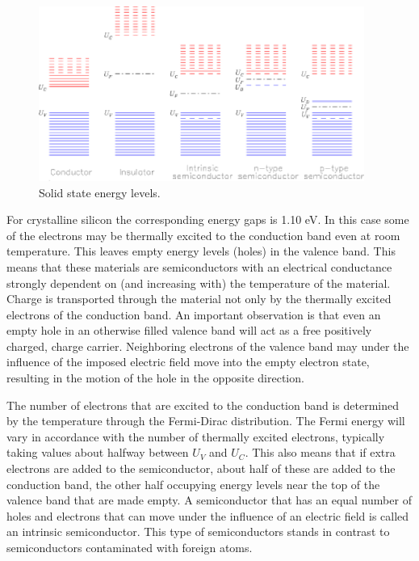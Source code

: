 \documentclass{article}
\begin{document}
\begin{figure}[h]
	\centering
	\includegraphics[width=0.95\textwidth]{CCD_solstate.eps}
	\caption{Solid state energy levels.}
	\label{fig:CCD.figsolstate}
\end{figure}

For crystalline silicon the corresponding energy gaps is 1.10 eV. In
this case some of the electrons may be thermally excited to the
conduction band even at room temperature. This leaves empty energy
levels (holes) in the valence band. This means that these materials
are semiconductors with an electrical conductance strongly dependent
on (and increasing with) the temperature of the material. Charge is
transported through the material not only by the thermally excited
electrons of the conduction band. An important observation is that
even an empty hole in an otherwise filled valence band will act as a
free positively charged, charge carrier. Neighboring electrons of the
valence band may under the influence of the imposed electric field
move into the empty electron state, resulting in the motion of the
hole in the opposite direction.

The number of electrons that are excited to the conduction band is
determined by the temperature through the Fermi-Dirac
distribution. The Fermi energy will vary in accordance with the number
of thermally excited electrons, typically taking values about halfway
between $U_V$ and $U_C$. This also means that if extra electrons are
added to the semiconductor, about half of these are added to the
conduction band, the other half occupying energy levels near the top
of the valence band that are made empty. A semiconductor that has an
equal number of holes and electrons that can move under the influence
of an electric field is called an intrinsic semiconductor. This type
of semiconductors stands in contrast to semiconductors contaminated
with foreign atoms.
\end{document}
